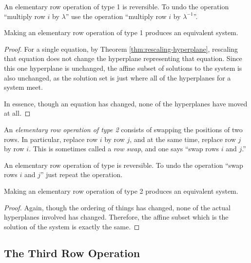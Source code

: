\documentclass[elementsmain.tex]{subfiles}
\begin{document}
\begin{remark}
An elementary row operation of type 1 is reversible. To undo the operation ``multiply row $i$ by $\lambda$'' use the operation ``multiply row $i$ by $\lambda^{-1}$''.
\end{remark}

\begin{theorem}
Making an elementary row operation of type 1 produces an equivalent system.
\end{theorem}

\begin{proof}
For a single equation, by Theorem \ref{thm:rescaling-hyperplane}, rescaling that equation does not change the hyperplane representing that equation. Since this one hyperplane is unchanged, the affine subset of solutions to the system is also unchanged, as the solution set is just where all of the hyperplanes for a system meet. 

In essence, though an equation has changed, none of the hyperplanes have moved at all.
\end{proof}


\begin{definition}
An \emph{elementary row operation of type 2} consists of swapping the positions of two rows. In particular, replace row $i$ by row $j$, and at the same time, replace row $j$ by row $i$. This is sometimes called a \emph{row swap}, and one says ``swap rows $i$ and $j$.''
\end{definition}

\begin{remark}
An elementary row operation of type  is reversible. To undo the operation ``swap rows $i$ and $j$'' just repeat the operation.
\end{remark}

\begin{theorem}
Making an elementary row operation of type 2 produces an equivalent system.
\end{theorem}

\begin{proof}
Again, though the ordering of things has changed, none of the actual hyperplanes involved has changed. Therefore, the affine subset which is the solution of the system is exactly the same.
\end{proof}


\subsection*{The Third Row Operation}
\end{document}
